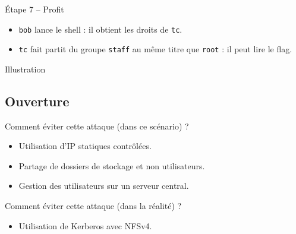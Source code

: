 \documentclass{beamer}
\begin{document}
        \begin{frame}[fragile]
            \begin{block}{Étape 7 -- Profit}
                \begin{itemize}
                    \item \verb+bob+ lance le shell : il obtient les droits de
                        \verb+tc+.
                    \item \verb+tc+ fait partit du groupe \verb+staff+ au même titre que
                        \verb+root+ : il peut lire le flag.
                \end{itemize}
            \end{block}
            \begin{exampleblock}{Illustration}
                \begin{center}
                \end{center}
            \end{exampleblock}
        \end{frame}
        
	\subsection{Ouverture}
        \begin{frame}
            \begin{block}{Comment éviter cette attaque (dans ce scénario) ?}
                \begin{itemize}
                    \item Utilisation d'IP statiques contrôlées.
                    \item Partage de dossiers de stockage et non utilisateurs.
                    \item Gestion des utilisateurs sur un serveur central.
                \end{itemize}
            \end{block}
            \begin{block}{Comment éviter cette attaque (dans la réalité) ?}
                \begin{itemize}
                    \item Utilisation de Kerberos avec NFSv4.
                \end{itemize}
            \end{block}
        \end{frame}

    
\end{document}
